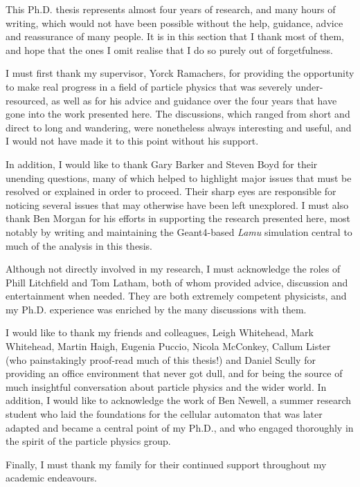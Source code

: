 This Ph.D. thesis represents almost four years of research, and many hours of writing, which would not have been possible without the help, guidance, advice and reassurance of many people. It is in this section that I thank most of them, and hope that the ones I omit realise that I do so purely out of forgetfulness.

I must first thank my supervisor, Yorck Ramachers, for providing the opportunity to make real progress in a field of particle physics that was severely under-resourced, as well as for his advice and guidance over the four years that have gone into the work presented here. The discussions, which ranged from short and direct to long and wandering, were nonetheless always interesting and useful, and I would not have made it to this point without his support.

In addition, I would like to thank Gary Barker and Steven Boyd for their unending questions, many of which helped to highlight major issues that must be resolved or explained in order to proceed. Their sharp eyes are responsible for noticing several issues that may otherwise have been left unexplored. I must also thank Ben Morgan for his efforts in supporting the research presented here, most notably by writing and maintaining the Geant4-based \emph{Lamu} simulation central to much of the analysis in this thesis.

Although not directly involved in my research, I must acknowledge the roles of Phill Litchfield and Tom Latham, both of whom provided advice, discussion and entertainment when needed. They are both extremely competent physicists, and my Ph.D. experience was enriched by the many discussions with them.

I would like to thank my friends and colleagues, Leigh Whitehead, Mark Whitehead, Martin Haigh, Eugenia Puccio, Nicola McConkey, Callum Lister (who painstakingly proof-read much of this thesis!) and Daniel Scully for providing an office environment that never got dull, and for being the source of much insightful conversation about particle physics and the wider world. In addition, I would like to acknowledge the work of Ben Newell, a summer research student who laid the foundations for the cellular automaton that was later adapted and became a central point of my Ph.D., and who engaged thoroughly in the spirit of the particle physics group.

Finally, I must thank my family for their continued support throughout my academic endeavours.


